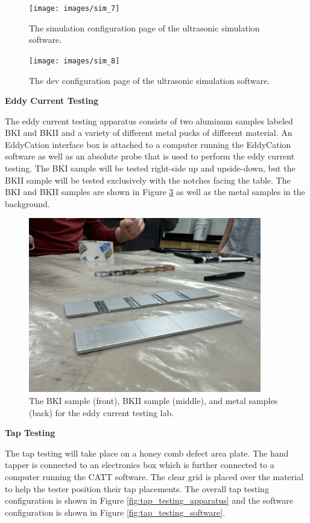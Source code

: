 \documentclass[12 pt]{report}
\begin{document}
\begin{figure}[htbp]
	\centering
	\texttt{[image: images/sim\_7]}
	\caption{The simulation configuration page of the ultrasonic simulation software.}
	\label{fig:sim_7}
\end{figure}

\begin{figure}[htbp]
	\centering
	\texttt{[image: images/sim\_8]}
	\caption{The dev configuration page of the ultrasonic simulation software.}
	\label{fig:sim_8}
\end{figure}

\newpage

\textbf{Eddy Current Testing}

The eddy current testing apparatus consists of two aluminum samples labeled BKI and BKII and a variety of different metal pucks of different material. An EddyCation interface box is attached to a computer running the EddyCation software as well as an absolute probe that is used to perform the eddy current testing. The BKI sample will be tested right-side up and upside-down, but the BKII sample will be tested exclusively with the notches facing the table. The BKI and BKII samples are shown in Figure \ref{fig:eddy_current_apparatus} as well as the metal samples in the background.

\begin{figure}[htbp]
	\centering
	\includegraphics[width=4in]{images/eddy_current_apparatus}
	\caption{The BKI sample (front), BKII sample (middle), and metal samples (back) for the eddy current testing lab.}
	\label{fig:eddy_current_apparatus}
\end{figure}

\textbf{Tap Testing}

The tap testing will take place on a  honey comb defect area plate. The hand tapper is connected to an electronics box which is further connected to a computer running the CATT software. The clear grid is placed over the material to help the tester position their tap placements. The overall tap testing configuration is shown in Figure \ref{fig:tap_testing_apparatus} and the software configuration is shown in Figure \ref{fig:tap_testing_software}.
\end{document}
